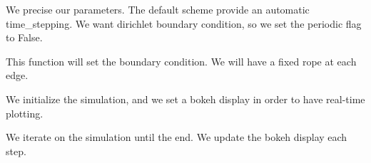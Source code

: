 \documentclass[letterpaper,10pt,english]{sphinxmanual}
\begin{document}
We precise our parameters. The default scheme provide an automatic
time\_stepping. We want dirichlet boundary condition, so we set the
periodic flag to False.

\begin{sphinxVerbatim}[commandchars=\\\{\}]
   
\end{sphinxVerbatim}

This function will set the boundary condition. We will have a fixed rope
at each edge.

\begin{sphinxVerbatim}[commandchars=\\\{\}]
   
    \PYG{p}{[}\PYG{p}{]}  
    \PYG{p}{[}\PYG{p}{]}  
    \PYG{p}{[}\PYG{p}{]}  
    \PYG{p}{[}\PYG{p}{]}  
      
\end{sphinxVerbatim}

We initialize the simulation, and we set a bokeh display in order to
have real-time plotting.

\begin{sphinxVerbatim}[commandchars=\\\{\}]
  
     
                         
\end{sphinxVerbatim}

We iterate on the simulation until the end. We update the bokeh display
each step.
\end{document}
